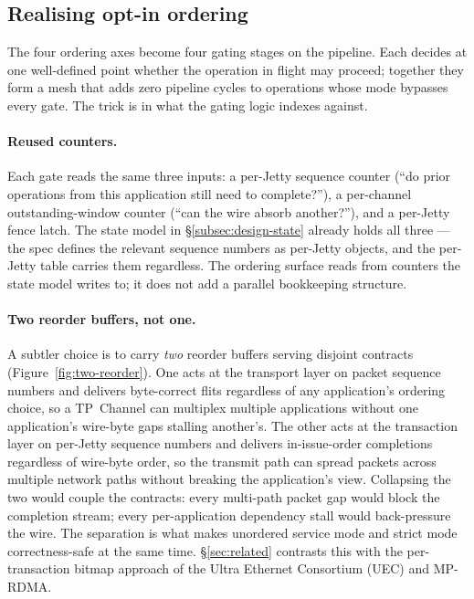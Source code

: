\documentclass[10pt,twocolumn]{article}
\begin{document}
\subsection{Realising opt-in ordering}
\label{subsec:design-ordering}

The four ordering axes become four gating stages on the pipeline.
Each decides at one well-defined point whether the operation in
flight may proceed; together they form a mesh that adds zero
pipeline cycles to operations whose mode bypasses every gate. The
trick is in what the gating logic indexes against.

\paragraph{Reused counters.}
Each gate reads the same three inputs: a per-Jetty sequence
counter (``do prior operations from this application still need
to complete?''), a per-channel outstanding-window counter (``can
the wire absorb another?''), and a per-Jetty fence latch. The
state model in \S\ref{subsec:design-state} already holds all
three --- the spec defines the relevant sequence numbers as
per-Jetty objects, and the per-Jetty table carries them
regardless. The ordering surface reads from counters the state
model writes to; it does not add a parallel bookkeeping
structure.

\paragraph{Two reorder buffers, not one.}
A subtler choice is to carry \emph{two} reorder buffers serving
disjoint contracts (Figure~\ref{fig:two-reorder}). One acts at
the transport layer on packet sequence numbers and delivers
byte-correct flits regardless of any application's ordering
choice, so a TP~Channel can multiplex multiple applications
without one application's wire-byte gaps stalling another's. The
other acts at the transaction layer on per-Jetty sequence numbers
and delivers in-issue-order completions regardless of wire-byte
order, so the transmit path can spread packets across multiple
network paths without breaking the application's view. Collapsing
the two would couple the contracts: every multi-path packet gap
would block the completion stream; every per-application
dependency stall would back-pressure the wire. The separation is
what makes unordered service mode and strict mode correctness-safe
at the same time. \S\ref{sec:related} contrasts this with the per-transaction
bitmap approach of the Ultra Ethernet Consortium (UEC) and
MP-RDMA.
\end{document}
